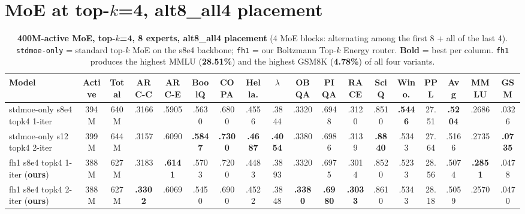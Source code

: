\documentclass[oneside]{article}
\begin{document}
\section{MoE at top-$k$=4, alt8\_all4 placement}
\label{sec:topk4}

\begin{table}[t]
\centering
\caption{\textbf{400M-active MoE, top-$k$=4, 8 experts, alt8\_all4 placement} (4 MoE blocks: alternating among the first 8 + all of the last 4). \texttt{stdmoe-only} = standard top-$k$ MoE on the s8e4 backbone; \texttt{fh1} = our Boltzmann Top-$k$ Energy router. \textbf{Bold} = best per column. \texttt{fh1} produces the highest MMLU (\textbf{28.51\%}) and the highest GSM8K (\textbf{4.78\%}) of all four variants.}
\label{tab:topk4}
\begin{adjustbox}{max width=\textwidth}
\begin{tabular}{l|cc|cccccccccccc|c|cc}
\toprule
\textbf{Model} & \textbf{Active} & \textbf{Total} & \textbf{ARC-C} & \textbf{ARC-E} & \textbf{BoolQ} & \textbf{COPA} & \textbf{Hella.} & \textbf{$\lambda$} & \textbf{OBQA} & \textbf{PIQA} & \textbf{RACE} & \textbf{SciQ} & \textbf{Wino.} & \textbf{PPL} & \textbf{Avg} & \textbf{MMLU} & \textbf{GSM} \\
\midrule
stdmoe-only s8e4 topk4 1-iter      & 394M & 640M & .3166 & .5905 & .5630 & .6800 & .4556 & .3844 & .3320 & .6948 & .3120 & .8510 & \textbf{.5446} & 27.51 & \textbf{.5204} & .2686 & .0326 \\
stdmoe-only s12  topk4 2-iter      & 399M & 644M & .3157 & .6090 & \textbf{.5847} & \textbf{.7300} & \textbf{.4687} & \textbf{.4054} & .3380 & .6986 & .3139 & \textbf{.8840} & .5343 & 27.64 & .5166 & .2735 & \textbf{.0735} \\
\midrule
fh1 s8e4 topk4 1-iter (\textbf{ours}) & 388M & 627M & .3183 & \textbf{.6141} & .5703 & .7200 & .4483 & .3893 & .3320 & .6975 & .3014 & .8520 & .5233 & 28.56 & .5074 & \textbf{.2851} & .0478 \\
fh1 s8e4 topk4 2-iter (\textbf{ours}) & 388M & 627M & \textbf{.3302} & .6069 & .5450 & .6900 & .4522 & .3848 & \textbf{.3380} & \textbf{.6980} & \textbf{.3033} & .8610 & .5343 & 28.18 & .5059 & .2570 & .0470 \\
\bottomrule
\end{tabular}
\end{adjustbox}
\end{table}
\end{document}
